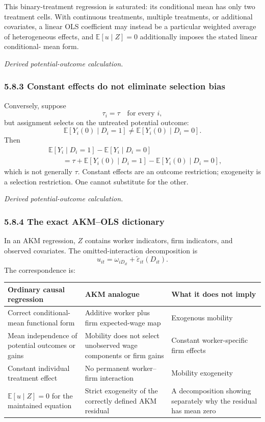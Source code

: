 \documentclass[11pt]{article}
\begin{document}
This binary-treatment regression is saturated: its conditional mean has
only two treatment cells.  With continuous treatments, multiple treatments,
or additional covariates, a linear OLS coefficient may instead be a
particular weighted average of heterogeneous effects, and
\(\mathbb E[u\mid Z]=0\) additionally imposes the stated linear conditional-
mean form.

\textit{Derived potential-outcome calculation.}

\subsubsection{5.8.3 Constant effects do not eliminate selection bias}

Conversely, suppose
\[
\tau_i=\tau
\quad\text{for every }i,
\tag{T5.40}
\]
but assignment selects on the untreated potential outcome:
\[
\mathbb E[Y_i(0)\mid D_i=1]
\neq
\mathbb E[Y_i(0)\mid D_i=0].
\tag{T5.41}
\]
Then
\[
\begin{aligned}
&\mathbb E[Y_i\mid D_i=1]
-\mathbb E[Y_i\mid D_i=0]\\
&\qquad =
\tau
+\mathbb E[Y_i(0)\mid D_i=1]
-\mathbb E[Y_i(0)\mid D_i=0],
\end{aligned}
\tag{T5.42}
\]
which is not generally \(\tau\).  Constant effects are an outcome
restriction; exogeneity is a selection restriction.  One cannot substitute
for the other.

\textit{Derived potential-outcome calculation.}

\subsubsection{5.8.4 The exact AKM--OLS dictionary}

In an AKM regression, \(Z\) contains worker indicators, firm indicators, and
observed covariates.  The omitted-interaction decomposition is
\[
u_{it}
=
\omega_{iD_{it}}
+\widetilde\varepsilon_{it}(D_{it}).
\tag{T5.43}
\]
The correspondence is:

\begin{longtable}{p{}p{}p{}}
\textbf{Ordinary causal regression} &
\textbf{AKM analogue} &
\textbf{What it does not imply} \\
\hline
Correct conditional-mean functional form &
Additive worker plus firm expected-wage map &
Exogenous mobility \\
Mean independence of potential outcomes or gains &
Mobility does not select unobserved wage components or firm gains &
Constant worker-specific firm effects \\
Constant individual treatment effect &
No permanent worker--firm interaction &
Mobility exogeneity \\
\(\mathbb E[u\mid Z]=0\) for the maintained equation &
Strict exogeneity of the correctly defined AKM residual &
A decomposition showing separately why the residual has mean zero \\
\end{longtable}
\end{document}

